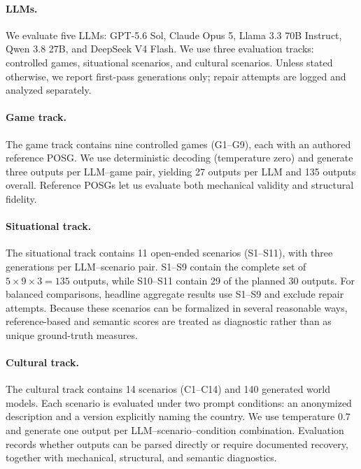\documentclass{article}
\begin{document}
\paragraph{LLMs.}
We evaluate five LLMs: GPT-5.6 Sol, Claude Opus 5, Llama 3.3 70B Instruct, Qwen 3.8 27B, and DeepSeek V4 Flash. We use three evaluation tracks: controlled games, situational scenarios, and cultural scenarios. Unless stated otherwise, we report first-pass generations only; repair attempts are logged and analyzed separately.

\paragraph{Game track.}
The game track contains nine controlled games (G1--G9), each with an authored reference POSG. We use deterministic decoding (temperature zero) and generate three outputs per LLM--game pair, yielding 27 outputs per LLM and 135 outputs overall. Reference POSGs let us evaluate both mechanical validity and structural fidelity.

\paragraph{Situational track.}
The situational track contains 11 open-ended scenarios (S1--S11), with three generations per LLM--scenario pair. S1--S9 contain the complete set of $5 \times 9 \times 3 = 135$ outputs, while S10--S11 contain 29 of the planned 30 outputs. For balanced comparisons, headline aggregate results use S1--S9 and exclude repair attempts. Because these scenarios can be formalized in several reasonable ways, reference-based and semantic scores are treated as diagnostic rather than as unique ground-truth measures.

\paragraph{Cultural track.}
The cultural track contains 14 scenarios (C1--C14) and 140 generated world models. Each scenario is evaluated under two prompt conditions: an anonymized description and a version explicitly naming the country. We use temperature $0.7$ and generate one output per LLM--scenario--condition combination. Evaluation records whether outputs can be parsed directly or require documented recovery, together with mechanical, structural, and semantic diagnostics.
\end{document}
